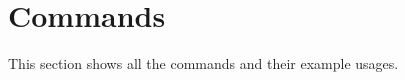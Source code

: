 \documentclass[11pt]{article}
\begin{document}



\newpage

\section{Commands}
This section shows all the commands and their example usages.
\end{document}
